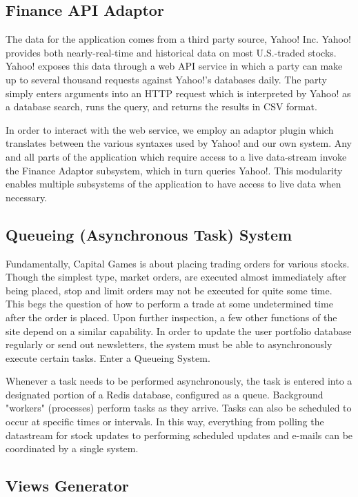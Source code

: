 \subsection{Finance API Adaptor}
The data for the application comes from a third party source, Yahoo! Inc. Yahoo!
provides both nearly-real-time and historical data on most U.S.-traded stocks.
Yahoo! exposes this data through a web API service in which a party can make
up to several thousand requests against Yahoo!'s databases daily. The party
simply enters arguments into an HTTP request which is interpreted by Yahoo!
as a database search, runs the query, and returns the results in CSV format. \cite{gummy}

In order to interact with the web service, we employ an adaptor plugin which
translates between the various syntaxes used by Yahoo! and our own system.
Any and all parts of the application which require access to a live data-stream
invoke the Finance Adaptor subsystem, which in turn queries Yahoo!. This
modularity enables multiple subsystems of the application to have access to live data
when necessary.

\subsection{Queueing (Asynchronous Task) System}

Fundamentally, Capital Games is about placing trading orders for various stocks. 
Though the simplest type, market orders, are executed almost immediately after being 
placed, stop and limit orders may not be executed for quite some time. \cite{inv:market}
\cite{inv:stop} \cite{inv:limit} This begs the question of how to perform a trade
at some undetermined time after the order is placed. 
Upon further inspection, a few other functions of the site depend on a similar capability.
In order to update the user portfolio database regularly or send out newsletters, the system 
must be able to asynchronously execute certain tasks. Enter a Queueing System.

Whenever a task needs to be performed asynchronously, the task is entered into a 
designated portion of a Redis database, configured as a queue. Background "workers" 
(processes) perform tasks as they arrive. Tasks can also be scheduled to occur at specific
times or intervals. In this way, everything from polling the datastream for stock updates
to performing scheduled updates and e-mails can be coordinated by a single system.

\subsection{Views Generator}

